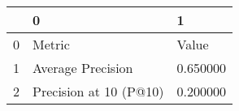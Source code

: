 \begin{tabular}{lll}
\toprule
 & 0 & 1 \\
\midrule
0 & Metric & Value \\
1 & Average Precision & 0.650000 \\
2 & Precision at 10 (P@10) & 0.200000 \\
\bottomrule
\end{tabular}
